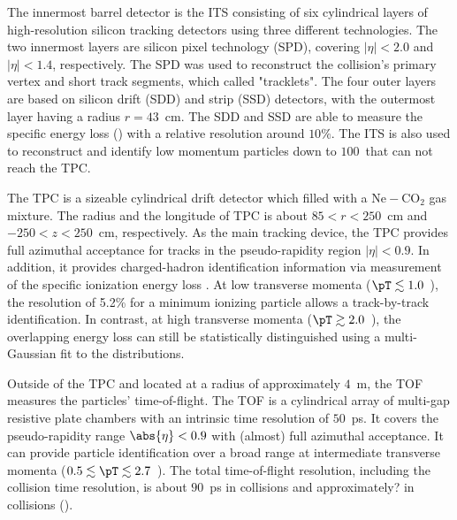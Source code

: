 \documentclass[ALICE,manyauthors]{cernphprep}
\begin{document}
The innermost barrel detector is the ITS consisting of six cylindrical layers of high-resolution silicon tracking detectors using three different technologies.
The two innermost layers are silicon pixel technology (SPD), covering $|\eta| < 2.0$ and $|\eta| < 1.4$, respectively.
The SPD was used to reconstruct the collision's primary vertex and short track segments, which called "tracklets".
The four outer layers are based on silicon drift (SDD) and strip (SSD) detectors, with the outermost layer having a radius $r = 43$~cm.
The SDD and SSD are able to measure the specific energy loss (\dEdx) with a relative resolution around $10\%$.
The ITS is also used to reconstruct and identify low momentum particles down to $100$~\MeVc that can not reach the TPC.

The TPC is a sizeable cylindrical drift detector which filled with a $\mathrm{Ne-CO_{2}}$ gas mixture.
The radius and the longitude of TPC is about $85 < r < 250 $~cm and $-250 < z < 250 $~cm, respectively.
As the main tracking device, the TPC provides full azimuthal acceptance for tracks in the pseudo-rapidity region $|\eta| < 0.9$.
In addition, it provides charged-hadron identification information via measurement of the specific ionization energy loss \dEdx.
At low transverse momenta ($\pT \lesssim 1.0$~\GeVc), the \dEdx resolution of 5.2\% for a minimum ionizing particle allows a track-by-track identification. In contrast, at high transverse momenta ($\pT \gtrsim 2.0$~\GeVc), the overlapping energy loss can still be statistically distinguished using a multi-Gaussian fit to the \dEdx distributions.

Outside of the TPC and located at a radius of approximately $4$~m, the TOF measures the particles' time-of-flight.
The TOF is a cylindrical array of multi-gap resistive plate chambers with an intrinsic time resolution of $50$~ps.
It covers the pseudo-rapidity range $\abs{\eta} < 0.9$ with (almost) full azimuthal acceptance.
It can provide particle identification over a broad range at intermediate transverse momenta ($0.5 \lesssim \pT \lesssim 2.7$~\GeVc).
The total time-of-flight resolution, including the collision time resolution, is about $90$~ps in \pp collisions and approximately? in \pPb collisions ().
\end{document}
